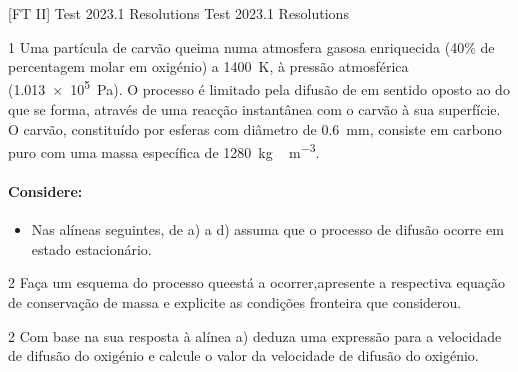 \documentclass[\mainfilename]{subfiles}
\begin{document}

[FT II]
{Test 2023.1 Resolutions} %
{Test 2023.1 Resolutions} %

\begin{questionBox}1{ %
    Uma partícula de carvão queima numa atmosfera gasosa enriquecida (40\% de percentagem molar em oxigénio) a \qty*{1400}{\K}, à pressão atmosférica (\qty*{1.013e5}{\Pa}). O processo é limitado pela difusão de  em sentido oposto ao do  que se forma, através de uma reacção instantânea com o carvão à sua superfície. O carvão, constituído por esferas com diâmetro de \qty*{0.6}{\mm}, consiste em carbono puro com uma massa específica de \qty*{1280}{\kg\,\m^{-3}}.
} %
    {\large\bfseries
    }
    \paragraph*{Considere:}
    \begin{itemize}
        \item Nas alíneas seguintes, de a) a d) assuma que o processo de difusão ocorre em estado estacionário.
    \end{itemize}
\end{questionBox}

\begin{questionBox}2{ %
    Faça um esquema do processo queestá a ocorrer,apresente a respectiva equação de conservação de massa e explicite as condições fronteira que considerou.
} %
\end{questionBox}

\begin{questionBox}2{ %
    Com base na sua resposta à alínea a) deduza uma expressão para a velocidade de difusão do oxigénio e calcule o valor da velocidade de difusão do oxigénio. 
} %
    \answer{}
\end{questionBox}
\end{document}
